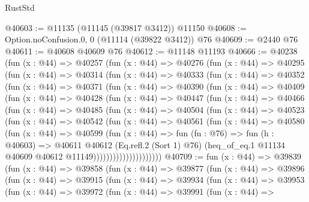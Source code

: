 \begin{lexlean}{RustStd}
\begin{coremodule}
@40603 := @11135 (@11145 (@39817 @3412)) @11150
@40608 := Option.noConfusion.{0, 0} (@11114 (@39822 @3412)) @76
@40609 := @2440 @76
@40611 := @40608 @40609 @76
@40612 := @11148 @11193
@40666 := @40238
    (fun (x : @44) =>
    @40257
      (fun (x : @44) =>
      @40276
        (fun (x : @44) =>
        @40295
          (fun (x : @44) =>
          @40314
            (fun (x : @44) =>
            @40333
              (fun (x : @44) =>
              @40352
                (fun (x : @44) =>
                @40371
                  (fun (x : @44) =>
                  @40390
                    (fun (x : @44) =>
                    @40409
                      (fun (x : @44) =>
                      @40428
                        (fun (x : @44) =>
                        @40447
                          (fun (x : @44) =>
                          @40466
                            (fun (x : @44) =>
                            @40485
                              (fun (x : @44) =>
                              @40504
                                (fun (x : @44) =>
                                @40523
                                  (fun (x : @44) =>
                                  @40542
                                    (fun (x : @44) =>
                                    @40561
                                      (fun (x : @44) =>
                                      @40580
                                        (fun (x : @44) =>
                                        @40599
                                          (fun (x : @44) =>
                                          fun (fn : @76) =>
                                          fun (h : @40603) =>
                                          @40611
                                            @40612
                                            (Eq.refl.{2} (Sort 1) @76)
                                            (heq_of_eq.{1}
                                              @11134
                                              @40609
                                              @40612
                                              @11149)))))))))))))))))))))
@40709 := fun (x : @44) =>
  @39839
    (fun (x : @44) =>
    @39858
      (fun (x : @44) =>
      @39877
        (fun (x : @44) =>
        @39896
          (fun (x : @44) =>
          @39915
            (fun (x : @44) =>
            @39934
              (fun (x : @44) =>
              @39953
                (fun (x : @44) =>
                @39972
                  (fun (x : @44) =>
                  @39991
                    (fun (x : @44) =>

\end{coremodule}
\end{lexlean}

